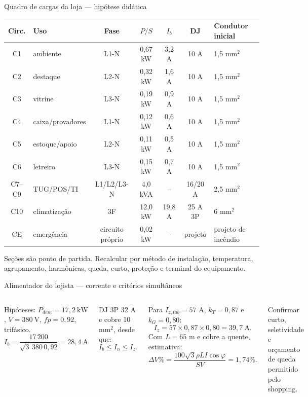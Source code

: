 \begin{frame}{Quadro de cargas da loja — hipótese didática}
\scriptsize
\begin{tabularx}{\textwidth}{c l c c c c X}
\toprule
Circ. & Uso & Fase & $P/S$ & $I_b$ & DJ & Condutor inicial \\
\midrule
C1 & ambiente & L1-N & 0,67 kW & 3,2 A & 10 A & 1,5 mm$^2$ \\
C2 & destaque & L2-N & 0,32 kW & 1,6 A & 10 A & 1,5 mm$^2$ \\
C3 & vitrine & L3-N & 0,19 kW & 0,9 A & 10 A & 1,5 mm$^2$ \\
C4 & caixa/provadores & L1-N & 0,12 kW & 0,6 A & 10 A & 1,5 mm$^2$ \\
C5 & estoque/apoio & L2-N & 0,11 kW & 0,5 A & 10 A & 1,5 mm$^2$ \\
C6 & letreiro & L3-N & 0,15 kW & 0,7 A & 10 A & 1,5 mm$^2$ \\
C7--C9 & TUG/POS/TI & L1/L2/L3-N & 4,0 kVA & -- & 16/20 A & 2,5 mm$^2$ \\
C10 & climatização & 3F & 12,0 kW & 19,8 A & 25 A 3P & 6 mm$^2$ \\
CE & emergência & circuito próprio & 0,02 kW & -- & projeto & projeto de incêndio \\
\bottomrule
\end{tabularx}
\begin{caixaAt}
Seções são ponto de partida. Recalcular por método de instalação, temperatura, agrupamento, harmônicas, queda, curto, proteção e terminal do equipamento.
\end{caixaAt}
\end{frame}

\begin{frame}{Alimentador do lojista — corrente e critérios simultâneos}
\small
\begin{columns}[T,onlytextwidth]
Hipóteses: $P_{dem}=17{,}2\ \mathrm{kW}$, $V=380\ \mathrm{V}$, $fp=0{,}92$, trifásico.
\[
I_b=\frac{17\,200}{\sqrt3\,380\,0{,}92}=28{,}4\ \mathrm{A}
\]
\begin{caixaEx}[title=Seleção preliminar]
DJ 3P 32 A e cobre 10 mm$^2$, desde que:
\[
I_b\leq I_n\leq I_z.
\]
\end{caixaEx}
Para $I_{z,tab}=57$ A, $k_T=0{,}87$ e $k_G=0{,}80$:
\[
I_z=57\times0{,}87\times0{,}80=39{,}7\ \mathrm{A}.
\]
Com $L=65$ m e cobre a quente, estimativa:
\[
\Delta V\%=\frac{100\sqrt3\rho L I\cos\varphi}{SV}=1{,}74\%.
\]
\begin{caixaAt}
Confirmar curto, seletividade e orçamento de queda permitido pelo shopping.
\end{caixaAt}
\end{columns}
\end{frame}

